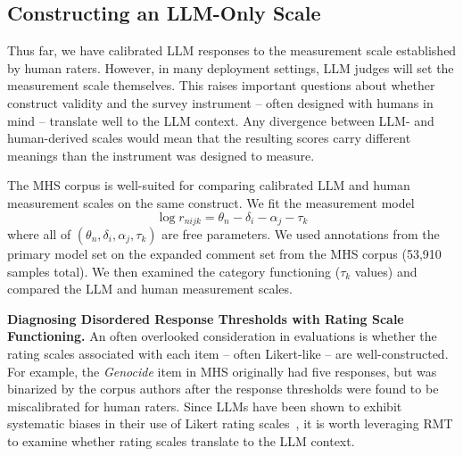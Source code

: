 \documentclass[11pt]{article}
\begin{document}
\subsection{Constructing an LLM-Only Scale}
Thus far, we have calibrated LLM responses to the measurement scale established by human raters. However, in many deployment settings, LLM judges will set the measurement scale themselves. This raises important questions about whether construct validity and the survey instrument -- often designed with humans in mind -- translate well to the LLM context. Any divergence between LLM- and human-derived scales would mean that the resulting scores carry different meanings than the instrument was designed to measure.

The MHS corpus is well-suited for comparing calibrated LLM and human measurement scales on the same construct. We fit the measurement model
\begin{equation}
\log r_{nijk} = \theta_n - \delta_i - \alpha_j -\tau_k \label{eqn:model4}
\end{equation}
where all of $(\theta_n, \delta_i, \alpha_j, \tau_k)$ are free parameters. We used annotations from the primary model set on the expanded comment set from the MHS corpus (53,910 samples total). We then examined the category functioning ($\tau_k$ values) and compared the LLM and human measurement scales.


\textbf{Diagnosing Disordered Response Thresholds with Rating Scale Functioning.} An often overlooked consideration in evaluations is whether the rating scales associated with each item -- often Likert-like -- are well-constructed. For example, the \textit{Genocide} item in MHS originally had five responses, but was binarized by the corpus authors after the response thresholds were found to be miscalibrated for human raters. Since LLMs have been shown to exhibit systematic biases in their use of Likert rating scales~\cite{tjuatja2024llms, salecha2024llms}, it is worth leveraging RMT to examine whether rating scales translate to the LLM context.
\end{document}
